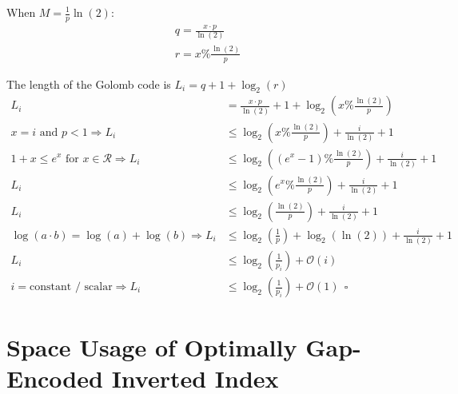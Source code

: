 \documentclass[12pt]{article}%
\begin{document}
When $M = \frac{1}{p}\ln(2)$:
\begin{align}
q = \frac{x \cdot p}{\ln(2)}\\
r = x \% \frac{\ln(2)}{p}
\end{align}

The length of the Golomb code is $L_{i} = q + 1 + \log_{2}(r)$
\begin{align}
L_{i} &= \frac{x \cdot p}{\ln(2)} + 1 + \log_{2}\left(x \% \frac{\ln(2)}{p}\right)\\
x = i \text{ and } p < 1 \Rightarrow L_{i} &\leq \log_{2}\left(x \% \frac{\ln(2)}{p}\right) + \frac{i}{\ln(2)} + 1\\
1 + x \leq e^{x}\text{ for }x \in \mathcal{R} \Rightarrow L_{i} &\leq \log_{2}\left(\left(e^{x} - 1\right)\% \frac{\ln(2)}{p}\right) + \frac{i}{\ln(2)} + 1\\
L_{i} &\leq \log_{2}\left(e^{x}\% \frac{\ln(2)}{p}\right) + \frac{i}{\ln(2)} + 1\\
L_{i} &\leq \log_{2}\left(\frac{\ln(2)}{p}\right) + \frac{i}{\ln(2)} + 1\\
\log(a \cdot b) = \log(a) + \log(b) \Rightarrow L_{i} &\leq \log_{2}\left(\frac{1}{p}\right) + \log_{2}(\ln(2)) + \frac{i}{\ln(2)} + 1\\
L_{i} &\leq \log_{2}\left(\frac{1}{p_{i}}\right) + \mathcal{O}(i)\\
i = \text{constant / scalar} \Rightarrow L_{i} &\leq \log_{2}\left(\frac{1}{p_{i}}\right) + \mathcal{O}(1) \: \: \square
\end{align}

\section{Space Usage of Optimally Gap-Encoded Inverted Index}
\end{document}
